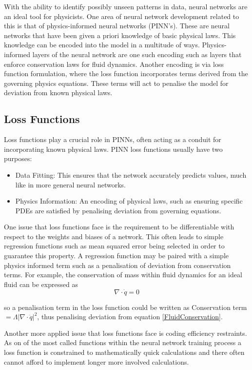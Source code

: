 \documentclass[10pt]{iopart}
\begin{document}
With the ability to identify possibly unseen patterns in data, neural networks are an ideal tool for physicists. One area of neural network development related to this is that of physics-informed neural networks (PINN's). These are neural networks that have been given a priori knowledge of basic physical laws. This knowledge can be encoded into the model in a multitude of ways. Physics-informed layers of the neural network are one such encoding such as layers that enforce conservation laws for fluid dynamics. Another encoding is via loss function formulation, where the loss function incorporates terms derived from the governing physics equations. These terms will act to penalise the model for deviation from known physical laws. 

\subsection{Loss Functions}
Loss functions play a crucial role in PINNs, often acting as a conduit for incorporating known physical laws. PINN loss functions usually have two purposes:
\begin{itemize}
	\item Data Fitting: This ensures that the network accurately predicts values, much like in more general neural networks.
	\item Physics Information: An encoding of physical laws, such as ensuring specific PDEs are satisfied by penalising deviation from governing equations.
\end{itemize}

One issue that loss functions face is the requirement to be differentiable with respect to the weights and biases of a network. This often leads to simple regression functions such as mean squared error being selected in order to guarantee this property. A regression function may be paired with a simple physics informed term such as a penalisation of deviation from conservation terms. For example, the conservation of mass within fluid dynamics for an ideal fluid can be expressed as 
\begin{equation}
\label{FluidConservation}
	\nabla \cdot\dot q = 0
\end{equation}
 
so a penalisation term in the loss function could be written as Conservation term $=\Lambda|\nabla \cdot \dot q|^2$, thus penalising deviation from equation \ref{FluidConservation}.

Another more applied issue that loss functions face is coding efficiency restraints. As on of the most called functions within the neural network training process a loss function is constrained to mathematically quick calculations and there often cannot afford to implement longer more involved calculations. 
\end{document}
